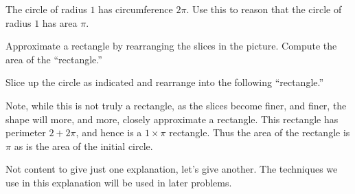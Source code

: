 \documentclass[newpage,hints,handout]{ximera}
\begin{document}
\begin{problem}
The circle of radius $1$ has circumference $2\pi$. Use this to reason
that the circle of radius $1$ has area $\pi$.
\begin{image}
\end{image}

\begin{hint}
Approximate a rectangle by rearranging the slices in the picture.
Compute the area of the ``rectangle.''
\end{hint}
\begin{freeResponse}
Slice up the circle as indicated and rearrange into the following
``rectangle.'' 
\begin{image}
\end{image}
Note, while this is not truly a rectangle, as the slices become finer,
and finer, the shape will more, and more, closely approximate a
rectangle. This rectangle has perimeter $2+2\pi$, and hence is a
$1\times \pi$ rectangle. Thus the area of the rectangle is $\pi$ as is
the area of the initial circle.
\end{freeResponse}
\end{problem}


Not content to give just one explanation, let's give another. The
techniques we use in this explanation will be used in later problems.
\end{document}
